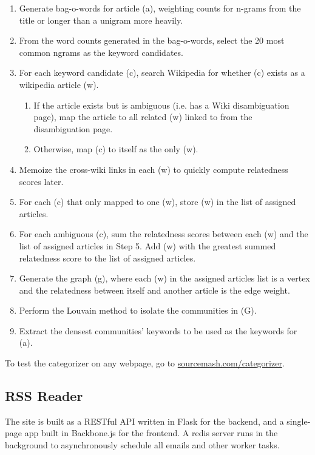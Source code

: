 \documentclass[11pt]{article}
\begin{document}
\begin{enumerate}

\item Generate bag-o-words for article (a), weighting counts for n-grams from the title or longer than a unigram more heavily.
\item From the word counts generated in the bag-o-words, select the 20 most common ngrams as the keyword candidates.
\item For each keyword candidate (c), search Wikipedia for whether (c) exists as a wikipedia article (w).
  \begin{enumerate}
  \item If the article exists but is ambiguous (i.e. has a Wiki disambiguation page), map the article to all related (w) linked to from the disambiguation page.
  \item Otherwise, map (c) to itself as the only (w).
  \end{enumerate}
\item Memoize the cross-wiki links in each (w) to quickly compute relatedness scores later.
\item For each (c) that only mapped to one (w), store (w) in the list of assigned articles.
\item For each ambiguous (c), sum the relatedness scores between each (w) and the list of assigned articles in Step 5. Add (w) with the greatest summed relatedness score to the list of assigned articles.
\item Generate the graph (g), where each (w) in the assigned articles list is a vertex and the relatedness between itself and another article is the edge weight.
\item Perform the Louvain method to isolate the communities in (G).
\item Extract the densest communities' keywords to be used as the keywords for (a).
\end{enumerate}

To test the categorizer on any webpage, go to \url{sourcemash.com/categorizer}.

\subsection{RSS Reader}

The site is built as a RESTful API written in Flask for the backend, and a single-page app built in Backbone.js for the frontend. A redis server runs in the background to asynchronously schedule all emails and other worker tasks.
\end{document}
